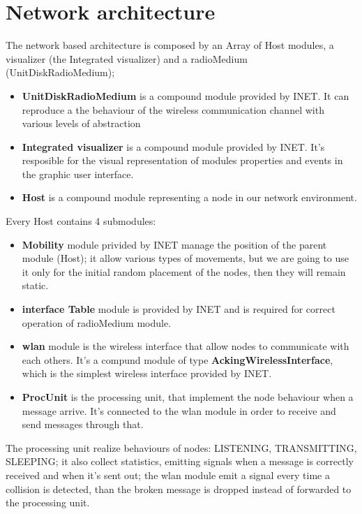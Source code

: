 \section{Network architecture}
The network based architecture is composed by an Array of Host modules, a
visualizer (the Integrated visualizer) and a radioMedium (UnitDiskRadioMedium);
\begin{itemize}
    \item \textbf{UnitDiskRadioMedium} is a compound module provided by INET. It can reproduce a the behaviour of the wireless communication 
    channel with various levels of abstraction
    \item \textbf{Integrated visualizer} is a compound module provided by INET. It's resposible for the visual representation of modules properties 
    and events in the graphic user interface.
    \item \textbf{Host} is a compound module representing a node in our network environment. 
\end{itemize}
Every Host contains 4 submodules:
\begin{itemize}
    \item \textbf{Mobility} module privided by INET manage the position of the parent module (Host); it allow various types of movements,
        but we are going to use it only for the initial random placement of the nodes, then they will remain static.
    \item \textbf{interface Table} module is provided by INET and is required for correct operation of radioMedium module.
    \item \textbf{wlan} module is the wireless interface that allow nodes to communicate with each others. It's a compund module of type 
        \textbf{AckingWirelessInterface}, which is the simplest wireless interface provided by INET.
    \item \textbf{ProcUnit} is the processing unit, that implement the node behaviour when a message arrive. It's connected to
    the wlan module in order to receive and send messages through that.
\end{itemize}

The processing unit realize behaviours of nodes: LISTENING, TRANSMITTING, SLEEPING; it also collect statistics, emitting signals when 
a message is correctly received and when it's sent out; the wlan module emit a signal every time a collision is detected, than the broken
message is dropped instead of forwarded to the processing unit. 
